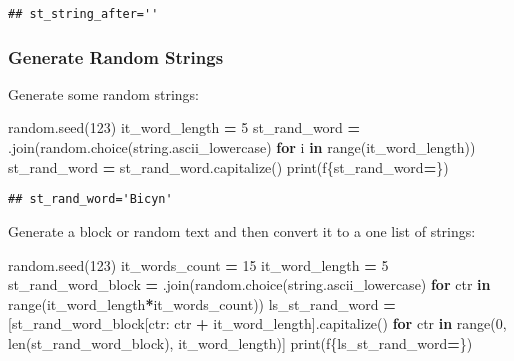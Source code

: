 \documentclass[
]{book}
\newenvironment{Shaded}{\begin{snugshade}}{\end{snugshade}}
\newcommand{\BuiltInTok}[1]{#1}
\newcommand{\ControlFlowTok}[1]{\textcolor[rgb]{0.13,0.29,0.53}{\textbf{#1}}}
\newcommand{\DecValTok}[1]{\textcolor[rgb]{0.00,0.00,0.81}{#1}}
\newcommand{\KeywordTok}[1]{\textcolor[rgb]{0.13,0.29,0.53}{\textbf{#1}}}
\newcommand{\NormalTok}[1]{#1}
\newcommand{\OperatorTok}[1]{\textcolor[rgb]{0.81,0.36,0.00}{\textbf{#1}}}
\newcommand{\SpecialCharTok}[1]{\textcolor[rgb]{0.00,0.00,0.00}{#1}}
\newcommand{\SpecialStringTok}[1]{\textcolor[rgb]{0.31,0.60,0.02}{#1}}
\newcommand{\StringTok}[1]{\textcolor[rgb]{0.31,0.60,0.02}{#1}}
\begin{document}
\begin{verbatim}
## st_string_after=''
\end{verbatim}

\hypertarget{generate-random-strings}{%
\subsubsection{Generate Random Strings}\label{generate-random-strings}}

Generate some random strings:

\begin{Shaded}
\begin{Highlighting}[]
\NormalTok{random.seed(}\DecValTok{123}\NormalTok{)}
\NormalTok{it\_word\_length }\OperatorTok{=} \DecValTok{5}
\NormalTok{st\_rand\_word }\OperatorTok{=} \StringTok{\textquotesingle{}\textquotesingle{}}\NormalTok{.join(random.choice(string.ascii\_lowercase) }\ControlFlowTok{for}\NormalTok{ i }\KeywordTok{in} \BuiltInTok{range}\NormalTok{(it\_word\_length))}
\NormalTok{st\_rand\_word }\OperatorTok{=}\NormalTok{ st\_rand\_word.capitalize()}
\BuiltInTok{print}\NormalTok{(}\SpecialStringTok{f\textquotesingle{}}\SpecialCharTok{\{}\NormalTok{st\_rand\_word}\OperatorTok{=}\SpecialCharTok{\}}\SpecialStringTok{\textquotesingle{}}\NormalTok{)}
\end{Highlighting}
\end{Shaded}

\begin{verbatim}
## st_rand_word='Bicyn'
\end{verbatim}

Generate a block or random text and then convert it to a one list of strings:

\begin{Shaded}
\begin{Highlighting}[]
\NormalTok{random.seed(}\DecValTok{123}\NormalTok{)}
\NormalTok{it\_words\_count }\OperatorTok{=} \DecValTok{15}
\NormalTok{it\_word\_length }\OperatorTok{=} \DecValTok{5}
\NormalTok{st\_rand\_word\_block }\OperatorTok{=} \StringTok{\textquotesingle{}\textquotesingle{}}\NormalTok{.join(random.choice(string.ascii\_lowercase) }\ControlFlowTok{for}\NormalTok{ ctr }\KeywordTok{in} \BuiltInTok{range}\NormalTok{(it\_word\_length}\OperatorTok{*}\NormalTok{it\_words\_count))}
\NormalTok{ls\_st\_rand\_word }\OperatorTok{=}\NormalTok{ [st\_rand\_word\_block[ctr: ctr }\OperatorTok{+}\NormalTok{ it\_word\_length].capitalize() }
                   \ControlFlowTok{for}\NormalTok{ ctr }\KeywordTok{in} \BuiltInTok{range}\NormalTok{(}\DecValTok{0}\NormalTok{, }\BuiltInTok{len}\NormalTok{(st\_rand\_word\_block), it\_word\_length)]}
\BuiltInTok{print}\NormalTok{(}\SpecialStringTok{f\textquotesingle{}}\SpecialCharTok{\{}\NormalTok{ls\_st\_rand\_word}\OperatorTok{=}\SpecialCharTok{\}}\SpecialStringTok{\textquotesingle{}}\NormalTok{)}
\end{Highlighting}
\end{Shaded}
\end{document}
